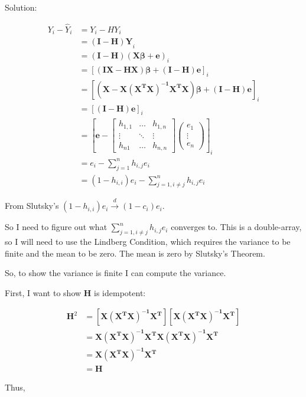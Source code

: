\documentclass[
  letterpaper,
  DIV=11,
  numbers=noendperiod]{scrreprt}
\begin{document}
Solution:

\[\begin{aligned}
Y_i - \hat{Y}_i &=  Y_i - HY_i \\
&= \mathbf{(I-H)Y}_i\\
&= \mathbf{(I-H)(X \boldsymbol \beta + e)}_i \\
&=\mathbf{[(IX-HX) \boldsymbol \beta + (I-H)e]}_i\\
&=\mathbf{[(X-X(X^TX)^{-1}X^TX) \boldsymbol \beta + (I-H)e]}_i \\
&=\mathbf{[(I-H)e]}_i \\
&= \left[\mathbf e - \begin{bmatrix} h_{1,1} & \dots & h_{1,n} \\
\vdots &\ddots &\vdots \\
h_{n1} & \dots &h_{n,n}
\end{bmatrix} \begin{pmatrix} e_1 \\ \vdots \\e_n \end{pmatrix} \right]_i\\
&= e_i - \sum_{j=1}^n h_{i,j}e_i \\
&= (1-h_{i,i})e_i - \sum_{j=1, i \neq j}^n h_{i,j}e_i
\end{aligned}\]

From Slutsky's \((1-h_{i,i})e_i \overset d \to (1-c_i) e_i\).

So I need to figure out what \(\sum_{j=1, i \neq j}^n h_{i,j}e_i\)
converges to. This is a double-array, so I will need to use the Lindberg
Condition, which requires the variance to be finite and the mean to be
zero. The mean is zero by Slutsky's Theorem.

So, to show the variance is finite I can compute the variance.

First, I want to show \(\mathbf H\) is idempotent:

\[\begin{aligned}
\mathbf H^2 &= \mathbf{[X(X^TX)^{-1}X^T][X(X^TX)^{-1}X^T]} \\
&=\mathbf{X(X^TX)^{-1}X^TX(X^TX)^{-1}X^T} \\
&=\mathbf{X(X^TX)^{-1}X^T} \\
&= \mathbf H
\end{aligned}\]

Thus,
\end{document}
